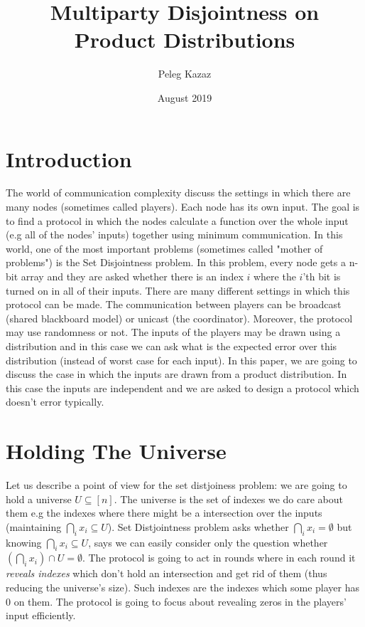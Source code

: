 \documentclass{article}
\title{Multiparty Disjointness on Product Distributions}
\author{Peleg Kazaz}
\date{August 2019}
\theoremstyle{plain}
\begin{document}
\maketitle


\section{Introduction}
The world of communication complexity discuss the settings in which there are many nodes (sometimes called players). Each node has its own input. The goal is to find a protocol in which the nodes calculate a function over the whole input (e.g all of the nodes' inputs) together using minimum communication. \newline
In this world, one of the most important problems (sometimes called "mother of problems") is the Set Disjointness problem. In this problem, every node gets a n-bit array and they are asked whether there is an index $i$ where the $i$'th bit is turned on in all of their inputs. \newline
There are many different settings in which this protocol can be made. The communication between players can be broadcast (shared blackboard model) or unicast (the coordinator). Moreover, the protocol may use randomness or not. The inputs of the players may be drawn using a distribution and in this case we can ask what is the expected error over this distribution (instead of worst case for each input). \newline
In this paper, we are going to discuss the case in which the inputs are drawn from a product distribution. In this case the inputs are independent and we are asked to design a protocol which doesn't error typically. \newline


\section{Holding The Universe}
Let us describe a point of view for the set distjoiness problem: we are going to hold a universe $U \subseteq [n]$. The universe is the set of indexes we do care about them e.g the indexes where there might be a intersection over the inputs (maintaining $\bigcap_i x_i \subseteq U$). Set Distjointness problem asks whether $\bigcap_i x_i = \emptyset$ but knowing $\bigcap_i x_i \subseteq U$, says we can easily consider only the question whether $(\bigcap_i x_i) \cap U = \emptyset$. The protocol is going to act in rounds where in each round it \emph{reveals indexes} which don't hold an intersection and get rid of them (thus reducing the universe's size). Such indexes are the indexes which some player has 0 on them. The protocol is going to focus about revealing zeros in the players' input efficiently. \newline
\end{document}
